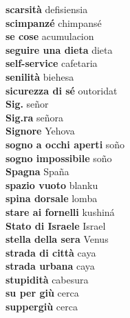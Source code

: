 \textbf{ scarsità  } defisiensia \\
\textbf{ scimpanzé  } chimpansé \\
\textbf{ se cose  } acumulacion \\
\textbf{ seguire una dieta  } dieta \\
\textbf{ self-service  } cafetaria \\
\textbf{ senilità  } biehesa \\
\textbf{ sicurezza di sé  } outoridat \\
\textbf{ Sig.  } señor \\
\textbf{ Sig.ra  } señora \\
\textbf{ Signore  } Yehova \\
\textbf{ sogno a occhi aperti  } soño \\
\textbf{ sogno impossibile  } soño \\
\textbf{ Spagna  } Spaña \\
\textbf{ spazio vuoto  } blanku \\
\textbf{ spina dorsale  } lomba \\
\textbf{ stare ai fornelli  } kushiná \\
\textbf{ Stato di Israele  } Israel \\
\textbf{ stella della sera  } Venus \\
\textbf{ strada di città  } caya \\
\textbf{ strada urbana  } caya \\
\textbf{ stupidità  } cabesura \\
\textbf{ su per giù  } cerca \\
\textbf{ suppergiù  } cerca \\
